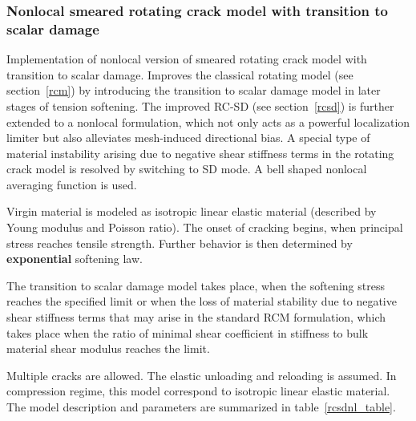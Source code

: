 \documentclass[a4paper]{article}
\begin{document}
\subsubsection{Nonlocal smeared rotating crack model with transition to scalar damage}
\label{rcsdnl}
Implementation of nonlocal version of smeared rotating crack model with transition to
scalar damage.
Improves the classical rotating model (see
section~\ref{rcm}) by introducing the transition to scalar damage
model in  later stages of tension softening.
The improved RC-SD (see section~\ref{rcsd}) is further extended to a
nonlocal formulation, which not only acts as a powerful localization
limiter but also alleviates mesh-induced directional bias. A special
type of material instability arising due to negative shear stiffness
terms in the rotating crack model is resolved by switching to SD mode. A bell shaped nonlocal
averaging function is used.

Virgin material is modeled as isotropic linear elastic material
(described by Young modulus and Poisson
ratio). The onset of cracking begins, when principal stress reaches
tensile strength.
Further behavior is then determined by {\bf exponential} softening law.

The transition to scalar damage model
takes place, when the softening stress reaches the specified limit or
when the loss of material stability due to negative shear stiffness
terms that may arise in the standard RCM formulation, which takes
place when the ratio of minimal shear coefficient in stiffness to
bulk material shear modulus reaches the limit.

Multiple cracks are allowed.
The elastic unloading and reloading is assumed.
In compression regime, this model correspond to isotropic linear elastic material.
The model description and parameters are summarized
in table~\ref{rcsdnl_table}.
\end{document}
